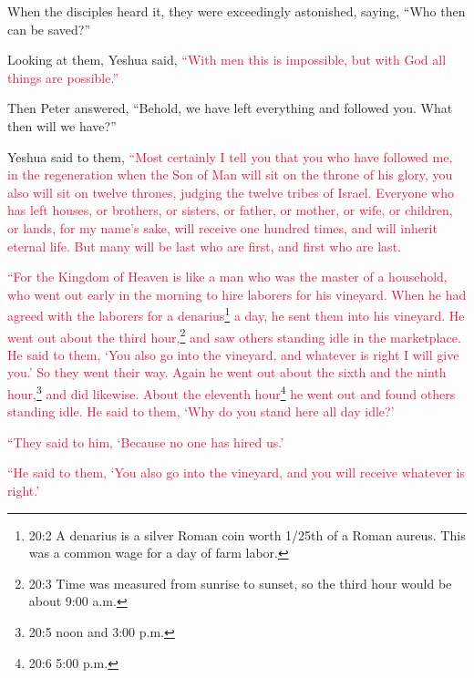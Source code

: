 \myverse{}When the disciples heard it, they were exceedingly astonished,
saying, “Who then can be saved?”

\myverse{}Looking at them, Yeshua said,
\textcolor{crimson}{“With men this is impossible, but with God all things are possible.”}

\myverse{}Then Peter answered, “Behold, we have left everything and followed
you. What then will we have?”

\myverse{}Yeshua said to them,
\textcolor{crimson}{“Most certainly I tell you that you who have followed me, in the regeneration when the Son of Man
	will sit on the throne of his glory, you also will sit on twelve thrones, judging the twelve tribes of
	Israel.
}
\myverse{}\textcolor{crimson}{Everyone who has left houses, or brothers, or sisters, or father, or
	mother, or wife, or children, or lands, for my name’s sake, will receive one hundred times, and will inherit
	eternal life.
}
\myverse{}\textcolor{crimson}{But many will be last who are first, and first who are last.
}


\mychapter{} \myverse*{}\textcolor{crimson}{“For the Kingdom of Heaven is like a man who was the master
	of a household, who went out early in the morning to hire laborers for his vineyard.
}
\myverse{}\textcolor{crimson}{When he had agreed with the laborers for a denarius}\footnote{20:2 A denarius is a silver Roman coin worth 1/25th of a Roman aureus. This was a common wage for
	a day of farm labor.}
\textcolor{crimson}{a day, he sent them into his vineyard.
}
\myverse{}\textcolor{crimson}{He went out about the third hour,}\footnote{20:3 Time was measured from sunrise to sunset, so the third hour would be about 9:00 a.m.}
\textcolor{crimson}{and saw others standing idle in the marketplace.
}
\myverse{}\textcolor{crimson}{He said to them, ‘You also go into the vineyard, and whatever is right
	I will give you.’ So they went their way.
}
\myverse{}\textcolor{crimson}{Again he went out about the sixth and the ninth hour,}\footnote{20:5 noon and 3:00 p.m.}
\textcolor{crimson}{and did likewise.
}
\myverse{}\textcolor{crimson}{About the eleventh hour}\footnote{20:6 5:00 p.m.}
\textcolor{crimson}{he went out and found others standing idle. He said to them, ‘Why do you stand here all day idle?’
}

\myverse{}\textcolor{crimson}{“They said to him, ‘Because no one has hired us.’}

\textcolor{crimson}{“He said to them, ‘You also go into the vineyard, and you will receive whatever is right.’
}

